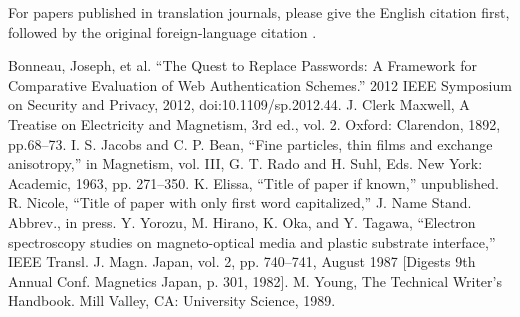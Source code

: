 \documentclass[conference]{IEEEtran}
\begin{document}
For papers published in translation journals, please give the English 
citation first, followed by the original foreign-language citation \cite{b6}.

\begin{thebibliography}{00}
 Bonneau, Joseph, et al. “The Quest to Replace Passwords: A Framework for Comparative Evaluation of Web Authentication Schemes.” 2012 IEEE Symposium on Security and Privacy, 2012, doi:10.1109/sp.2012.44.
 J. Clerk Maxwell, A Treatise on Electricity and Magnetism, 3rd ed., vol. 2. Oxford: Clarendon, 1892, pp.68--73.
 I. S. Jacobs and C. P. Bean, ``Fine particles, thin films and exchange anisotropy,'' in Magnetism, vol. III, G. T. Rado and H. Suhl, Eds. New York: Academic, 1963, pp. 271--350.
 K. Elissa, ``Title of paper if known,'' unpublished.
 R. Nicole, ``Title of paper with only first word capitalized,'' J. Name Stand. Abbrev., in press.
 Y. Yorozu, M. Hirano, K. Oka, and Y. Tagawa, ``Electron spectroscopy studies on magneto-optical media and plastic substrate interface,'' IEEE Transl. J. Magn. Japan, vol. 2, pp. 740--741, August 1987 [Digests 9th Annual Conf. Magnetics Japan, p. 301, 1982].
 M. Young, The Technical Writer's Handbook. Mill Valley, CA: University Science, 1989.
\end{thebibliography}
\end{document}
